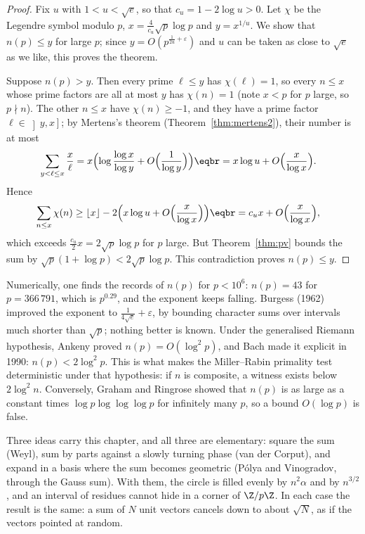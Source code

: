 \begin{proof}
Fix $u$ with $1<u<\sqrt e$, so that $c_u=1-2\log u>0$. Let $\chi$ be the Legendre symbol modulo $p$, $x=\frac4{c_u}\sqrt p\log p$ and $y=x^{1/u}$. We show that $n(p)\le y$ for large $p$; since $y=O(p^{\frac1{2u}+\varepsilon})$
and $u$ can be taken as close to $\sqrt e$ as we like, this proves the theorem.

Suppose $n(p)>y$. Then every prime $\ell\le y$ has $\chi(\ell)=1$, so every $n\le x$ whose prime factors are all at most $y$ has $\chi(n)=1$ (note $x<p$ for $p$ large, so $p\nmid n$). The other $n\le x$ have
$\chi(n)\ge-1$, and they have a prime factor $\ell\in\left]y,x\right]$; by Mertens's theorem (Theorem~\ref{thm:mertens2}), their number is at most
\[
\begin{aligned}\sum_{y<\ell\le x}\frac x\ell&=x\Bigl(\log\frac{\log x}{\log y}+O\Bigl(\frac1{\log y}\Bigr)\Bigr)\eqbr=x\log u+O\Bigl(\frac x{\log x}\Bigr).\end{aligned}
\]
Hence
\[
\begin{aligned}\sum_{n\le x}\chi(n)&\ge\lfloor x\rfloor-2\Bigl(x\log u+O\Bigl(\frac x{\log x}\Bigr)\Bigr)\eqbr=c_ux+O\Bigl(\frac x{\log x}\Bigr),\end{aligned}
\]
which exceeds $\frac{c_u}2x=2\sqrt p\log p$ for $p$ large. But Theorem~\ref{thm:pv} bounds the sum by $\sqrt p(1+\log p)<2\sqrt p\log p$. This contradiction proves $n(p)\le y$.
\end{proof}

\begin{remark}
Numerically, one finds the records of $n(p)$ for $p<10^6$: $n(p)=43$ for $p=366\,791$, which is $p^{0.29}$, and the exponent keeps falling. Burgess (1962) improved the exponent to $\frac1{4\sqrt e}+\varepsilon$, by bounding character
sums over intervals much shorter than $\sqrt p$; nothing better is known. Under the generalised Riemann hypothesis, Ankeny proved $n(p)=O(\log^2p)$, and Bach made it explicit in 1990: $n(p)<2\log^2p$. This is
what makes the Miller--Rabin primality test deterministic under that hypothesis: if $n$ is composite, a witness exists below $2\log^2n$. Conversely, Graham and Ringrose showed that $n(p)$ is as large as a constant
times $\log p\log\log\log p$ for infinitely many $p$, so a bound $O(\log p)$ is false.
\end{remark}

\begin{beauty}
Three ideas carry this chapter, and all three are elementary: square the sum (Weyl), sum by parts against a slowly turning phase (van der Corput), and expand in a basis where the sum becomes
geometric (Pólya and Vinogradov, through the Gauss sum). With them, the circle is filled evenly by $n^2\alpha$ and by $n^{3/2}$, and an interval of residues cannot hide in a corner of $\Z/p\Z$. In each case
the result is the same: a sum of $N$ unit vectors cancels down to about $\sqrt N$, as if the vectors pointed at random.
\end{beauty}


